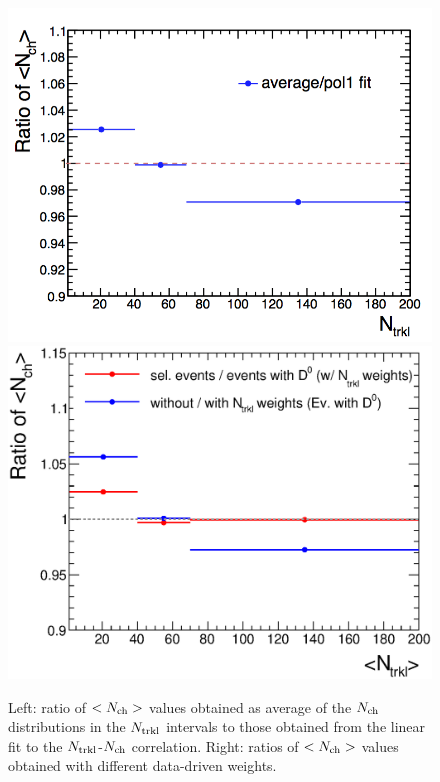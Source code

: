 \begin{figure}[!h]
\centering
 \includegraphics[width=.49\textwidth]{FigCap6/NchSystematics_linFit_WithNtrklsReweight_17f2a.png}
 \includegraphics[width=.49\textwidth]{FigCap6/NchSystematics_NtrklWeights_17f2a.eps}
 \caption{Left: ratio of $\averNch$ values obtained as average of the $N_{\rm ch}$ distributions in the $\Ntrkl$ intervals to those obtained from the linear fit to the $\Ntrkl$-$N_{\rm ch}$ correlation. Right: ratios of $\averNch$ values obtained with different data-driven weights.}
 \label{fig:NchVsCorrHypo}
 \end{figure}

\begin{table}[h!]
\centering
{}
\caption{$\averNch$ values and related systematic uncertainties in each of the three $\Ntrkl$ multiplicity intervals.}
\label{tab:averNchandSyst}
\end{table}


